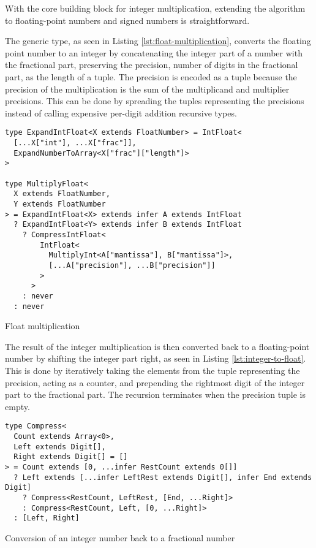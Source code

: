 With the core building block for integer multiplication, extending the algorithm to floating-point numbers and signed numbers is straightforward.

The  generic type, as seen in Listing \ref{lst:float-multiplication}, converts the floating point number to an integer by concatenating the integer part of a number with the fractional part, preserving the precision, number of digits in the fractional part, as the length of a tuple. The precision is encoded as a tuple because the precision of the multiplication is the sum of the multiplicand and multiplier precisions. This can be done by spreading the tuples representing the precisions instead of calling expensive per-digit addition recursive types.

\begin{listing}[ht]
  \begin{verbatim}
type ExpandIntFloat<X extends FloatNumber> = IntFloat<
  [...X["int"], ...X["frac"]],
  ExpandNumberToArray<X["frac"]["length"]>
>

type MultiplyFloat<
  X extends FloatNumber,
  Y extends FloatNumber
> = ExpandIntFloat<X> extends infer A extends IntFloat
  ? ExpandIntFloat<Y> extends infer B extends IntFloat
    ? CompressIntFloat<
        IntFloat<
          MultiplyInt<A["mantissa"], B["mantissa"]>,
          [...A["precision"], ...B["precision"]]
        >
      >
    : never
  : never
\end{verbatim}
  \caption{Float multiplication}\label{lst:float-multiplication}
\end{listing}

The result of the integer multiplication is then converted back to a floating-point number by shifting the integer part right, as seen in Listing \ref{lst:integer-to-float}. This is done by iteratively taking the elements from the tuple representing the precision, acting as a counter, and prepending the rightmost digit of the integer part to the fractional part. The recursion terminates when the precision tuple is empty.

\begin{listing}[ht]
  \begin{verbatim}
type Compress<
  Count extends Array<0>,
  Left extends Digit[],
  Right extends Digit[] = []
> = Count extends [0, ...infer RestCount extends 0[]]
  ? Left extends [...infer LeftRest extends Digit[], infer End extends Digit]
    ? Compress<RestCount, LeftRest, [End, ...Right]>
    : Compress<RestCount, Left, [0, ...Right]>
  : [Left, Right]
\end{verbatim}
  \caption{Conversion of an integer number back to a fractional number}\label{lst:integer-to-float}
\end{listing}
